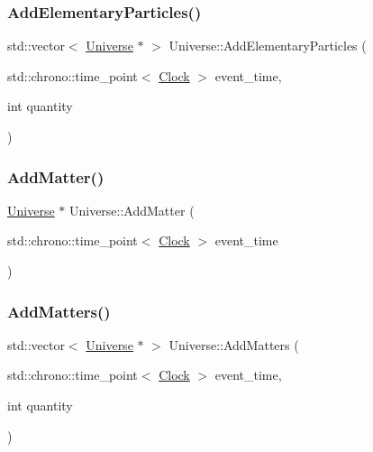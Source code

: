 \mbox{\label{classUniverse_a857cf7f208cd11c80736e82fa523feb5}} 
\subsubsection{\texorpdfstring{Add\+Elementary\+Particles()}{AddElementaryParticles()}}
{\footnotesize\ttfamily std\+::vector$<$ \mbox{\hyperlink{classUniverse}{Universe}} $\ast$ $>$ Universe\+::\+Add\+Elementary\+Particles (\begin{DoxyParamCaption}\item[{std\+::chrono\+::time\+\_\+point$<$ \mbox{\hyperlink{universe_8h_a0ef8d951d1ca5ab3cfaf7ab4c7a6fd80}{Clock}} $>$}]{event\+\_\+time,  }\item[{int}]{quantity }\end{DoxyParamCaption})}

\mbox{\label{classUniverse_a090d9ad1b88d81364e872e17d65edca4}} 
\subsubsection{\texorpdfstring{Add\+Matter()}{AddMatter()}}
{\footnotesize\ttfamily \mbox{\hyperlink{classUniverse}{Universe}} $\ast$ Universe\+::\+Add\+Matter (\begin{DoxyParamCaption}\item[{std\+::chrono\+::time\+\_\+point$<$ \mbox{\hyperlink{universe_8h_a0ef8d951d1ca5ab3cfaf7ab4c7a6fd80}{Clock}} $>$}]{event\+\_\+time }\end{DoxyParamCaption})}

\mbox{\label{classUniverse_ae00d10b2a23c9cedf1ff89e9da875563}} 
\subsubsection{\texorpdfstring{Add\+Matters()}{AddMatters()}}
{\footnotesize\ttfamily std\+::vector$<$ \mbox{\hyperlink{classUniverse}{Universe}} $\ast$ $>$ Universe\+::\+Add\+Matters (\begin{DoxyParamCaption}\item[{std\+::chrono\+::time\+\_\+point$<$ \mbox{\hyperlink{universe_8h_a0ef8d951d1ca5ab3cfaf7ab4c7a6fd80}{Clock}} $>$}]{event\+\_\+time,  }\item[{int}]{quantity }\end{DoxyParamCaption})}

